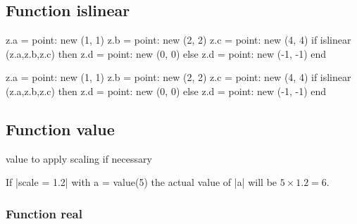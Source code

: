 \subsection{Function islinear} %
\label{sub:function_islinear}
\begin{minipage}{0.5\textwidth}
\begin{tkzexample}[latex=0cm,small,code only]
\begin{tkzelements}
   z.a = point: new (1, 1)
   z.b = point: new (2, 2)
   z.c = point: new (4, 4)
   if islinear (z.a,z.b,z.c) then
       z.d = point: new (0, 0)
    else 
        z.d = point: new (-1, -1)
   end
\end{tkzelements}
\end{tkzexample}
\end{minipage}
\begin{minipage}{0.5\textwidth}
\begin{tkzelements}
   z.a = point: new (1, 1)
   z.b = point: new (2, 2)
   z.c = point: new (4, 4)
   if islinear (z.a,z.b,z.c) then
       z.d = point: new (0, 0)
    else 
        z.d = point: new (-1, -1)
   end
\end{tkzelements}
 \hspace*{\fill}
\hspace*{\fill}
\end{minipage}


\subsection{Function  value }%
\label{sub:function_value}

value to apply scaling if necessary

If |scale = 1.2| with a = value(5) the actual value of |a| will be $5\times 1.2 = 6$.


\subsubsection{Function  real }%
\label{ssub:function_real}


